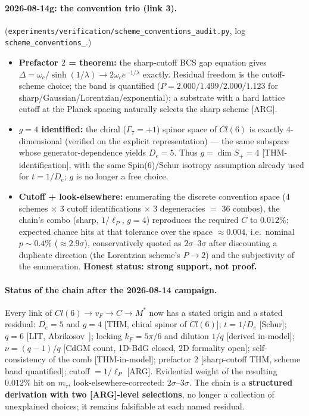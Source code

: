 \paragraph{2026-08-14g: the convention trio (link 3).}
(\texttt{experiments/\allowbreak verification/\allowbreak scheme\_\allowbreak conventions\_\allowbreak audit.py}, log
\texttt{scheme\_\allowbreak conventions\_}.)
\begin{itemize}
\item \textbf{Prefactor $2$ = theorem:} the sharp-cutoff BCS gap equation gives
$\Delta = \omega_c/\sinh(1/\lambda) \to 2\omega_c e^{-1/\lambda}$ exactly. Residual
freedom is the cutoff-scheme choice; the band is quantified
($P = 2.000/1.499/2.000/1.123$ for sharp/Gaussian/Lorentzian/exponential); a substrate
with a hard lattice cutoff at the Planck spacing naturally selects the sharp scheme [ARG].
\item \textbf{$g = 4$ identified:} the chiral ($\Gamma_7 = +1$) spinor space of $Cl(6)$
is exactly $4$-dimensional (verified on the explicit representation) --- the same
subspace whose generator-dependence yields $D_e = 5$. Thus $g = \dim S_+ = 4$
[THM-identification], with the same Spin(6)/Schur isotropy assumption already used for
$t = 1/D_e$; $g$ is no longer a free choice.
\item \textbf{Cutoff + look-elsewhere:} enumerating the discrete convention space
(4 schemes $\times$ 3 cutoff identifications $\times$ 3 degeneracies $=$ 36 combos), the
chain's combo (sharp, $1/\ell_P$, $g{=}4$) reproduces the required $C$ to $0.012\%$;
expected chance hits at that tolerance over the space $\approx 0.004$, i.e.\ nominal
$p \sim 0.4\%$ ($\approx 2.9\sigma$), conservatively quoted as
$2\sigma$--$3\sigma$ after discounting a duplicate direction (the Lorentzian scheme's
$P \to 2$) and the subjectivity of the enumeration. \textbf{Honest status: strong
support, not proof.}
\end{itemize}

\paragraph{Status of the chain after the 2026-08-14 campaign.} Every link of
$Cl(6) \to v_F \to C \to M^*$ now has a stated origin and a stated residual:
$D_e = 5$ and $g = 4$ [THM, chiral spinor of $Cl(6)$]; $t = 1/D_e$ [Schur];
$q = 6$ [LIT, Abrikosov~\cite{abrikosov1957}]; locking $k_F = 5\pi/6$ and dilution $1/q$ [derived in-model];
$\nu = (q-1)/q$ [CdGM count, 1D-BdG closed, 2D formality open]; self-consistency of the
comb [THM-in-model]; prefactor $2$ [sharp-cutoff THM, scheme band quantified]; cutoff
$= 1/\ell_P$ [ARG]. Evidential weight of the resulting $0.012\%$ hit on $m_\tau$,
look-elsewhere-corrected: $2\sigma$--$3\sigma$. The chain is a \textbf{structured
derivation with two [ARG]-level selections}, no longer a collection of unexplained
choices; it remains falsifiable at each named residual.
